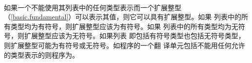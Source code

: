 \paragraph{} %
如果一个不能使用其列表中的任何类型表示而一个扩展整型
（\ref{basic.fundamental}）可以表示其值，则它可以具有扩展整型。如果
列表中的所有类型均为有符号，则扩展整型应该为有符号。如果
列表中的所有类型均为无符号，则扩展整型应该为无符号。如果列表
即包括有符号类型也包括无符号类型，则扩展整型可能为有符号或无符号。如程序的一个翻
译单元包括不能用任何允许的类型表示的则程序为\illform{}。
